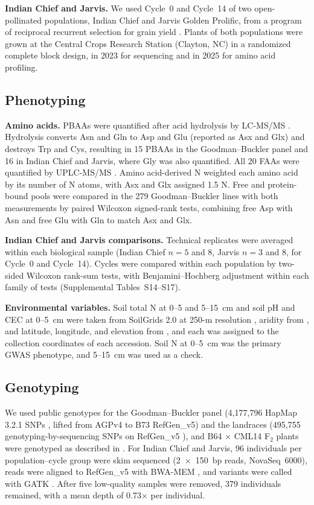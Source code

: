 \documentclass[namedate,unnumsec,webpdf,contemporary,large]{oup-authoring-template}
\begin{document}
\noindent\textbf{Indian Chief and Jarvis.} We used Cycle~0 and Cycle~14 of two open-pollinated populations, Indian Chief and Jarvis Golden Prolific, from a program of reciprocal recurrent selection for grain yield \citep{MollStuber1971,Moll1994}. Plants of both populations were grown at the Central Crops Research Station (Clayton, NC) in a randomized complete block design, in 2023 for sequencing and in 2025 for amino acid profiling.

\subsection{Phenotyping}

\noindent\textbf{Amino acids.} PBAAs were quantified after acid hydrolysis by LC-MS/MS \citep{Yobi2018PBAA}. Hydrolysis converts Asn and Gln to Asp and Glu (reported as Asx and Glx) and destroys Trp and Cys, resulting in 15 PBAAs in the Goodman--Buckler panel and 16 in Indian Chief and Jarvis, where Gly was also quantified. All 20 FAAs were quantified by UPLC-MS/MS \citep{Gu2007LCMS}. Amino acid-derived N weighted each amino acid by its number of N atoms, with Asx and Glx assigned 1.5 N. Free and protein-bound pools were compared in the 279 Goodman--Buckler lines with both measurements \citep{Shrestha2022} by paired Wilcoxon signed-rank tests, combining free Asp with Asn and free Glu with Gln to match Asx and Glx.

\noindent\textbf{Indian Chief and Jarvis comparisons.} Technical replicates were averaged within each biological sample (Indian Chief $n = 5$ and 8, Jarvis $n = 3$ and 8, for Cycle~0 and Cycle~14). Cycles were compared within each population by two-sided Wilcoxon rank-sum tests, with Benjamini--Hochberg adjustment within each family of tests (Supplemental Tables~S14--S17).

\noindent\textbf{Environmental variables.} Soil total N at 0--5 and 5--15~cm and soil pH and CEC at 0--5~cm were taken from SoilGrids 2.0 at 250-m resolution \citep{Poggio2021SoilGrids}, aridity from \citet{Zomer2022Aridity}, and latitude, longitude, and elevation from \citet{RomeroNavarro2017Landraces}, and each was assigned to the collection coordinates of each accession. Soil N at 0--5~cm was the primary GWAS phenotype, and 5--15~cm was used as a check.

\subsection{Genotyping}
We used public genotypes for the Goodman--Buckler panel (4,177,796 HapMap 3.2.1 SNPs \citealp{Bukowski2018HapMap3}, lifted from AGPv4 to B73 RefGen\_v5) and the landraces (495,755 genotyping-by-sequencing SNPs on RefGen\_v5 \citealp{RomeroNavarro2017Landraces}), and B64 $\times$ CML14 F$_2$ plants were genotyped as described in \citet{Fitzsimmons2026KernelKitchen}. For Indian Chief and Jarvis, 96 individuals per population--cycle group were skim sequenced (2~$\times$~150~bp reads, NovaSeq~6000), reads were aligned to RefGen\_v5 with BWA-MEM \citep{Li2013BWAMEM}, and variants were called with GATK \citep{McKenna2010GATK}. After five low-quality samples were removed, 379 individuals remained, with a mean depth of 0.73$\times$ per individual.
\end{document}
